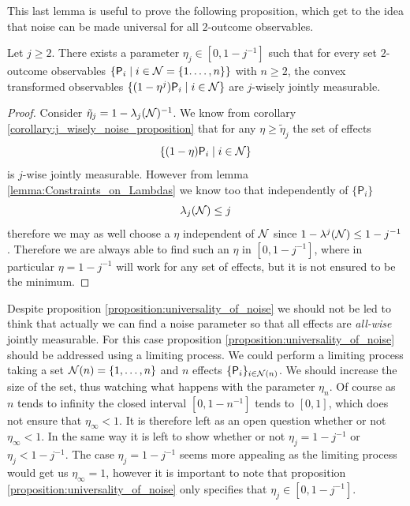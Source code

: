 \documentclass[10pt, a4paper]{amsart}
\begin{document}
 This last lemma is useful to prove the following proposition, which get to the idea that noise can be made universal for all $2$-outcome observables. 
\begin{proposition}\label{proposition:universality_of_noise}
Let $j\geq 2$.  There exists a parameter $\eta_{j}\in [0,1-j^{-1}]$ such that for every set $2$-outcome observables $\{\mathsf{P}_{i}\mid i\in \mathcal{N} = \{1. \ldots , n\}\}$ with $n\geq 2$,  the convex transformed  observables $\{(1-\eta^{j})\mathsf{P}_{i}\mid i\in \mathcal{N} \}$ are $j$-wisely jointly measurable.
\end{proposition} 
 

\begin{proof}
Consider $\tilde{\eta}_{j} = 1-\lambda_{j}(\mathcal{N})^{-1}$. We know from corollary \ref{corollary:j_wisely_noise_proposition} that for any $\eta \geq \tilde{\eta}_{j}$ the set of effects 
$$
\{(1-\eta)\mathsf{P}_{i} \mid i \in \mathcal{N}\}
$$
is $j$-wise jointly measurable. However from lemma \ref{lemma:Constraints_on_Lambdas} we know too that independently of $\{\mathsf{P}_{i}\}$ 
$$
\lambda_{j} (\mathcal{N})\leq j
$$
therefore we may as well choose a $\eta$ independent of $\mathcal{N}$ since $1-\lambda^{j} (\mathcal{N})\leq 1-j^{-1}$.
Therefore  we are always able to find such an $\eta$ in $ [0, 1-j^{-1}]$, where in particular $\eta = 1-j^{-1}$ will work for any set of effects, but it is not ensured to be the minimum.     

\end{proof}


Despite proposition \ref{proposition:universality_of_noise} we should not be led to think that actually we can find  a noise parameter 
so that all effects are \textit{all-wise} jointly measurable. For this case proposition \ref{proposition:universality_of_noise} should be addressed using a limiting process. We could 
perform a limiting process taking a set $\mathcal{N} (n) =\{1, \ldots , n\} $ and $n$ effects $\{\mathsf{P}_{i}\}_{i\in\mathcal{N}(n)}$. We should increase the size of the set, thus watching what happens with the parameter $\eta_{n}$. Of course as $n$ tends to infinity the closed interval $[0, 1-n^{-1}]$  tends to $[0,1]$, 
which does not ensure that $\eta_{\infty}<1$. It is therefore left as an open question whether or not $\eta_{\infty}<1$. In the same way it is left to show whether or not $\eta_{j} = 1-j^{-1}$ or $\eta_{j}<1-j^{-1}$. The case $\eta_{j} = 1-j^{-1}$ seems more appealing as the limiting process would get us $\eta_{\infty} =1$, however it is important to note that proposition \ref{proposition:universality_of_noise} only specifies that $\eta_{j}\in [0, 1-j^{-1}]$. \\
\end{document}
